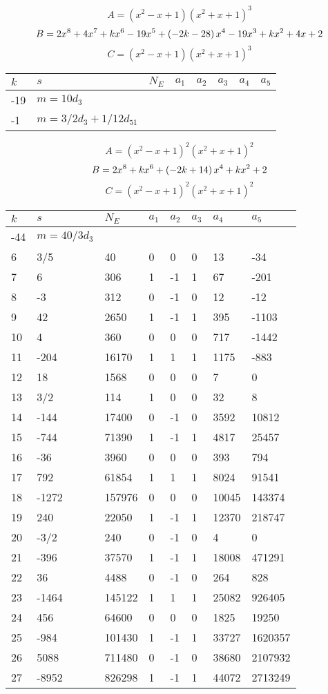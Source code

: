 \documentclass{amsart}
\begin{document}
$$A=(x^2
 - x
 + 1)(x^2
 + x
 + 1)^{3}$$
$$B=2\*x^8
 + 4\*x^7
 + k\*x^6
 - 19\*x^5
 + \left(-2\*k
 - 28\right) \*x^4
 - 19\*x^3
 + k\*x^2
 + 4\*x
 + 2$$
$$C=(x^2
 - x
 + 1)(x^2
 + x
 + 1)^{3}$$
\begin{longtable}{|l|l|l|lllll|}
\hline
$k$ & $s$ & $N_E$ & $a_1$ & $a_2$ & $a_3$ & $a_4$ & $a_5$\\
\hline
-19&$m=10d_{3}$&&\multicolumn{5}{c|}{}\\
-1&$m=3/2d_{3}+1/12d_{51}$&&\multicolumn{5}{c|}{}\\
\hline
\end{longtable}
$$A=(x^2
 - x
 + 1)^{2}(x^2
 + x
 + 1)^{2}$$
$$B=2\*x^8
 + k\*x^6
 + \left(-2\*k
 + 14\right) \*x^4
 + k\*x^2
 + 2$$
$$C=(x^2
 - x
 + 1)^{2}(x^2
 + x
 + 1)^{2}$$
\begin{longtable}{|l|l|l|lllll|}
\hline
$k$ & $s$ & $N_E$ & $a_1$ & $a_2$ & $a_3$ & $a_4$ & $a_5$\\
\hline
-44&$m=40/3d_{3}$&&\multicolumn{5}{c|}{}\\
6&3/5&40&0&0&0&13&-34\\
7&6&306&1&-1&1&67&-201\\
8&-3&312&0&-1&0&12&-12\\
9&42&2650&1&-1&1&395&-1103\\
10&4&360&0&0&0&717&-1442\\
11&-204&16170&1&1&1&1175&-883\\
12&18&1568&0&0&0&7&0\\
13&3/2&114&1&0&0&32&8\\
14&-144&17400&0&-1&0&3592&10812\\
15&-744&71390&1&-1&1&4817&25457\\
16&-36&3960&0&0&0&393&794\\
17&792&61854&1&1&1&8024&91541\\
18&-1272&157976&0&0&0&10045&143374\\
19&240&22050&1&-1&1&12370&218747\\
20&-3/2&240&0&-1&0&4&0\\
21&-396&37570&1&-1&1&18008&471291\\
22&36&4488&0&-1&0&264&828\\
23&-1464&145122&1&1&1&25082&926405\\
24&456&64600&0&0&0&1825&19250\\
25&-984&101430&1&-1&1&33727&1620357\\
26&5088&711480&0&-1&0&38680&2107932\\
27&-8952&826298&1&-1&1&44072&2713249\\

\end{longtable}
\end{document}
